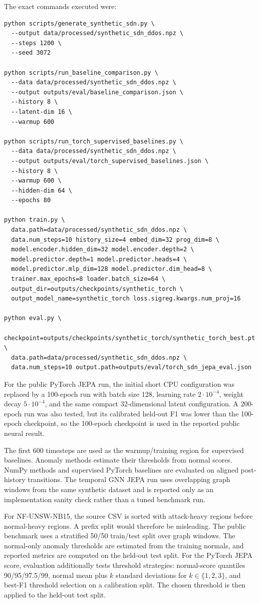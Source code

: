 \documentclass[runningheads]{llncs}
\begin{document}
The exact commands executed were:
\begin{verbatim}
python scripts/generate_synthetic_sdn.py \
  --output data/processed/synthetic_sdn_ddos.npz \
  --steps 1200 \
  --seed 3072

python scripts/run_baseline_comparison.py \
  --data data/processed/synthetic_sdn_ddos.npz \
  --output outputs/eval/baseline_comparison.json \
  --history 8 \
  --latent-dim 16 \
  --warmup 600

python scripts/run_torch_supervised_baselines.py \
  --data data/processed/synthetic_sdn_ddos.npz \
  --output outputs/eval/torch_supervised_baselines.json \
  --history 8 \
  --warmup 600 \
  --hidden-dim 64 \
  --epochs 80

python train.py \
  data.path=data/processed/synthetic_sdn_ddos.npz \
  data.num_steps=10 history_size=4 embed_dim=32 prog_dim=8 \
  model.encoder.hidden_dim=32 model.encoder.depth=2 \
  model.predictor.depth=1 model.predictor.heads=4 \
  model.predictor.mlp_dim=128 model.predictor.dim_head=8 \
  trainer.max_epochs=8 loader.batch_size=64 \
  output_dir=outputs/checkpoints/synthetic_torch \
  output_model_name=synthetic_torch loss.sigreg.kwargs.num_proj=16

python eval.py \
  checkpoint=outputs/checkpoints/synthetic_torch/synthetic_torch_best.pt \
  data.path=data/processed/synthetic_sdn_ddos.npz \
  data.num_steps=10 output.path=outputs/eval/torch_sdn_jepa_eval.json
\end{verbatim}

For the public PyTorch JEPA run, the initial short CPU configuration was
replaced by a 100-epoch run with batch size 128, learning rate $2\cdot10^{-4}$,
weight decay $5\cdot10^{-4}$, and the same compact 32-dimensional latent
configuration. A 200-epoch run was also tested, but its calibrated held-out F1
was lower than the 100-epoch checkpoint, so the 100-epoch checkpoint is used in
the reported public neural result.

The first 600 timesteps are used as the warmup/training region for supervised
baselines. Anomaly methods estimate their thresholds from normal scores. NumPy
methods and supervised PyTorch baselines are evaluated on aligned post-history
transitions. The temporal GNN JEPA run uses overlapping graph windows from the
same synthetic dataset and is reported only as an implementation sanity check
rather than a tuned benchmark run.

For NF-UNSW-NB15, the source CSV is sorted with attack-heavy regions before
normal-heavy regions. A prefix split would therefore be misleading. The public
benchmark uses a stratified 50/50 train/test split over graph windows. The
normal-only anomaly thresholds are estimated from the training normals, and
reported metrics are computed on the held-out test split.
For the PyTorch JEPA score, evaluation additionally tests threshold strategies:
normal-score quantiles 90/95/97.5/99, normal mean plus $k$ standard deviations
for $k\in\{1,2,3\}$, and best-F1 threshold selection on a calibration split.
The chosen threshold is then applied to the held-out test split.
\end{document}
